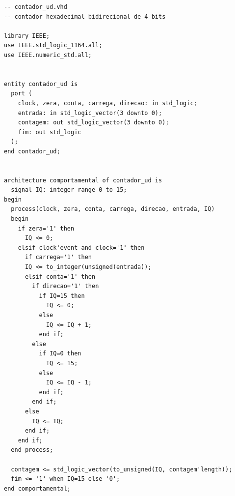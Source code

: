 \documentclass[a4,12pt]{horizon-theme}
\newenvironment{code}{\captionsetup{type=listing}}{}
\begin{document}
\newpage
\begin{code}
  \label{lst:contador_ud}
  \begin{verbatim}
-- contador_ud.vhd
-- contador hexadecimal bidirecional de 4 bits

library IEEE;
use IEEE.std_logic_1164.all;
use IEEE.numeric_std.all;


entity contador_ud is
  port (
    clock, zera, conta, carrega, direcao: in std_logic;
    entrada: in std_logic_vector(3 downto 0);
    contagem: out std_logic_vector(3 downto 0);
    fim: out std_logic
  );
end contador_ud;


architecture comportamental of contador_ud is
  signal IQ: integer range 0 to 15;
begin
  process(clock, zera, conta, carrega, direcao, entrada, IQ)
  begin
    if zera='1' then
      IQ <= 0;
    elsif clock'event and clock='1' then    
      if carrega='1' then
      IQ <= to_integer(unsigned(entrada));
      elsif conta='1' then  
        if direcao='1' then
          if IQ=15 then 
            IQ <= 0;
          else 
            IQ <= IQ + 1;
          end if;
        else
          if IQ=0 then
            IQ <= 15;
          else
            IQ <= IQ - 1;
          end if;
        end if;
      else
        IQ <= IQ;
      end if;
    end if;
  end process;

  contagem <= std_logic_vector(to_unsigned(IQ, contagem'length));
  fim <= '1' when IQ=15 else '0';
end comportamental;
\end{verbatim}
\end{code}
\end{document}
